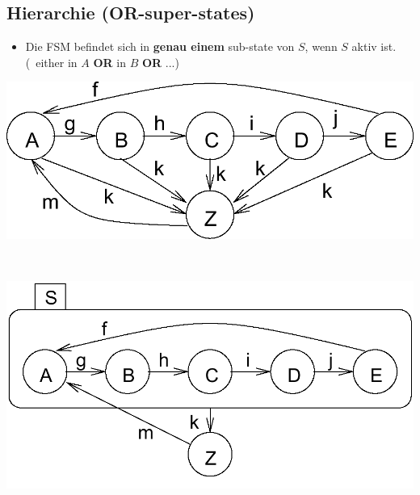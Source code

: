 \subsection{Hierarchie (OR-super-states)}

\begin{itemize}
    \item Die FSM befindet sich in \textbf{genau einem} sub-state von $S$, wenn $S$ aktiv ist.\\
        (\textrightarrow\ either in $A$ \textbf{OR} in $B$ \textbf{OR} ...)
\end{itemize}

\vspace{0.2cm}

\begin{minipage}[c]{0.41\columnwidth}
    \includegraphics[width=\columnwidth]{images/statechart_unuebersichtlich.png}
\end{minipage}
\hfill
\begin{minipage}[c]{0.05\columnwidth}
    \begin{center}
        \huge \textrightarrow\
    \end{center}
\end{minipage}
\hfill
\begin{minipage}[c]{0.41\columnwidth}
    \includegraphics[width=\columnwidth]{images/statechart_hierarchie.png}
\end{minipage}


